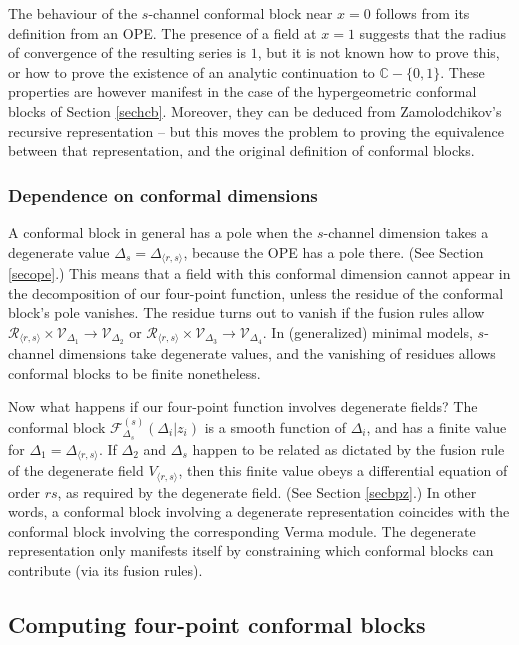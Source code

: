 \documentclass[12pt, a4paper, notitlepage, twoside]{report}
\numberwithin{equation}{section}
\theoremstyle{break}
\begin{document}
The behaviour of the $s$-channel conformal block near $x=0$ follows from its definition from an OPE. The presence of a field at $x=1$ suggests that the radius of convergence of the resulting series is $1$, but it is not known how to prove this, or how to prove the existence of an analytic continuation to $\mathbb{C}-\{0,1\}$. These properties are however manifest in the case of the hypergeometric conformal blocks of Section \ref{sechcb}. Moreover, they can be deduced from Zamolodchikov's recursive representation -- but this moves the problem to proving the equivalence between that representation, and the original definition of conformal blocks.


\subsubsection{Dependence on conformal dimensions}

A conformal block in general has a pole when the $s$-channel dimension takes a degenerate value $\Delta_s=\Delta_{\langle r,s\rangle}$, because the OPE has a pole there. (See Section \ref{secope}.) 
This means that a field with this conformal dimension cannot appear in the decomposition of our four-point function, unless the residue of the conformal block's pole vanishes. The residue turns out to vanish if the fusion rules allow $\mathcal{R}_{\langle r,s \rangle}\times \mathcal{V}_{\Delta_1}\to \mathcal{V}_{\Delta_2}$ or $\mathcal{R}_{\langle r,s \rangle}\times \mathcal{V}_{\Delta_3}\to \mathcal{V}_{\Delta_4}$. 
In (generalized) minimal models, $s$-channel dimensions take degenerate values, and the vanishing of residues allows conformal blocks to be finite nonetheless.

Now what happens if our four-point function involves degenerate fields? 
The conformal block $\mathcal{F}^{(s)}_{\Delta_s}(\Delta_i|z_i)$ is a smooth function of $\Delta_i$, and has a finite value for $\Delta_1 = \Delta_{\langle r,s\rangle}$. 
If $\Delta_2$ and $\Delta_s$ happen to be related as dictated by the fusion rule of the degenerate field $V_{\langle r,s\rangle}$, then this finite value obeys a differential equation of order $rs$, as required by the degenerate field. (See Section \ref{secbpz}.) 
In other words, a conformal block involving a degenerate representation coincides with the conformal block involving the corresponding Verma module.
The degenerate representation only manifests itself by constraining which conformal blocks can contribute (via its fusion rules).

\subsection{Computing four-point conformal blocks}
\end{document}
